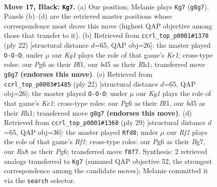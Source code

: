 \documentclass[11pt]{article}
\begin{document}
\clearpage

\begin{figure}[p]\centering
\begin{subfigure}{0.46\textwidth}\centering
\resizebox{\linewidth}{!}{%
\newchessgame
\chessboard[
  setfen={r1b2rk1/pp5p/6p1/2pBbp1n/7P/4P1P1/PP1P1P2/RNB1RK2 b - - 0 17},
  showmover=false,
  pgfstyle=straightmove, color=movearrow, markmove={g8-g7}
]}
\caption{}
\end{subfigure}\hfill
\begin{subfigure}{0.46\textwidth}\centering
\resizebox{\linewidth}{!}{%
\newchessgame
\chessboard[
  setfen={r3kb1r/1b1pnppp/p3p3/1p6/3BP3/2N2PP1/PPP3P1/R3KB1R w KQkq - 1 12},
  showmover=false,
  pgfstyle=straightmove, color=movearrow, markmove={e1-c1}
]}
\caption{}
\end{subfigure}
\\[4pt]
\begin{subfigure}{0.46\textwidth}\centering
\resizebox{\linewidth}{!}{%
\newchessgame
\chessboard[
  setfen={r3kb1r/1b1pnppp/p3p3/1p6/3BP3/2N2PP1/PPP3P1/R3KB1R w KQkq - 1 12},
  showmover=false,
  pgfstyle=straightmove, color=movearrow, markmove={e1-c1}
]}
\caption{}
\end{subfigure}\hfill
\begin{subfigure}{0.46\textwidth}\centering
\resizebox{\linewidth}{!}{%
\newchessgame
\chessboard[
  setfen={r4rk1/pp3pbp/2n3p1/3BPb2/8/1P2P1P1/1P3P1P/R1B1NRK1 b - - 0 15},
  showmover=false,
  pgfstyle=straightmove, color=movearrow, markmove={f8-d8}
]}
\caption{}
\end{subfigure}
\caption{\textbf{Move 17, Black: \texttt{Kg7}.} (a) Our position; Melanie plays \texttt{Kg7} (\texttt{g8g7}). Panels (b)--(d) are the retrieved master positions whose correspondence most drove this move (highest QAP objective among those that transfer to it). (b) Retrieved from \texttt{ccrl\_top\_p0001\#1370} (ply 22) [structural distance $d$=65, QAP obj=26]: the master played \texttt{O-O-O}; under $\mu$ our \emph{Kg1} plays the role of that game's \emph{Ke1}; cross-type roles: our \emph{P}g6 as their \emph{B}f1, our \emph{b}d5 as their \emph{R}h1; transferred move \texttt{g8g7} \textbf{(endorses this move)}. (c) Retrieved from \texttt{ccrl\_top\_p0003\#1485} (ply 22) [structural distance $d$=65, QAP obj=26]: the master played \texttt{O-O-O}; under $\mu$ our \emph{Kg1} plays the role of that game's \emph{Ke1}; cross-type roles: our \emph{P}g6 as their \emph{B}f1, our \emph{b}d5 as their \emph{R}h1; transferred move \texttt{g8g7} \textbf{(endorses this move)}. (d) Retrieved from \texttt{ccrl\_top\_p0001\#1368} (ply 29) [structural distance $d$=65, QAP obj=36]: the master played \texttt{Rfd8}; under $\mu$ our \emph{Rf1} plays the role of that game's \emph{Rf1}; cross-type roles: our \emph{P}g6 as their \emph{B}g7, our \emph{R}a8 as their \emph{P}g6; transferred move \texttt{f8f7}. Synthesis: 2 retrieved analogs transferred to \texttt{Kg7} (summed QAP objective 52, the strongest correspondence among the candidate moves); Melanie committed it via the \texttt{search} selector.}
\label{fig:thought-m33}
\end{figure}
\end{document}
